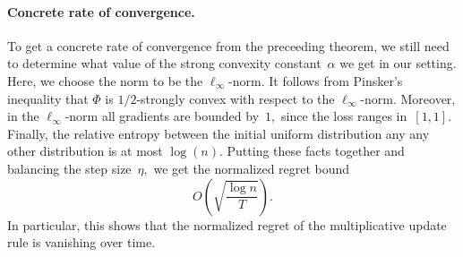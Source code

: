 \paragraph{Concrete rate of convergence.}
To get a concrete rate of convergence from the preceeding theorem,
we still need to determine what value of the strong convexity
constant~$\alpha$ we get in our setting. Here, we choose the norm to be the
$\ell_\infty$-norm. It follows from Pinsker's inequality
that $\Phi$ is $1/2$-strongly convex with respect to the $\ell_\infty$-norm.
Moreover, in the $\ell_\infty$-norm all gradients are bounded by~$1,$ since the
loss ranges in~$[1,1].$ Finally, the relative entropy between the initial
uniform distribution any any other distribution is at most $\log(n).$ Putting
these facts together and balancing the step size~$\eta,$ we get the normalized 
regret bound
\[
O\left(\sqrt{\frac{\log n}{T}}\right).
\]
In particular, this shows that the normalized regret of the multiplicative
update rule is vanishing over time.
